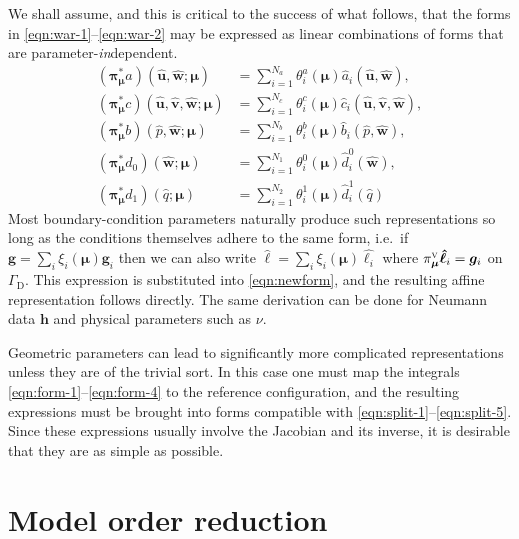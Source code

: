 \documentclass[onecolumn, twoside, a4paper, 11pt]{article}
\begin{document}
We shall assume, and this is critical to the success of what follows, that the
forms in \eqref{eqn:war-1}--\eqref{eqn:war-2} may be expressed as linear
combinations of forms that are parameter-\emph{in}dependent.
\begin{align}
  (\bm\pi_{\bm\mu}^* a)(
    \hat{\bm u},
    \hat{\bm w};
    \bm \mu
  ) &= \sum_{i=1}^{N_a} \theta^a_i(\bm \mu) \hat{a}_i(\hat{\bm u}, \hat{\bm w}), \label{eqn:split-1} \\
  (\bm\pi_{\bm\mu}^* c)(
    \hat{\bm u},
    \hat{\bm v},
    \hat{\bm w};
    \bm \mu
  ) &= \sum_{i=1}^{N_c} \theta^c_i(\bm \mu)
      \hat{c}_i(\hat{\bm u}, \hat{\bm v}, \hat{\bm w}), \label{eqn:split-2} \\
  (\bm\pi_{\bm\mu}^* b)(
    \hat{p},
     \hat{\bm w};
    \bm \mu
  ) &= \sum_{i=1}^{N_b} \theta^b_i(\bm \mu) \hat{b}_i(\hat{p}, \hat{\bm w}), \label{eqn:split-3} \\
  (\bm\pi_{\bm\mu}^* d_0)(
    \hat{\bm w};
    \bm \mu
  ) &= \sum_{i=1}^{N_1} \theta^0_i(\bm \mu) \hat{d}^0_i(\hat{\bm w}), \label{eqn:split-4} \\
  (\bm\pi_{\bm\mu}^* d_1)(
    \hat{q};
    \bm \mu
  ) &= \sum_{i=1}^{N_2} \theta^1_i(\bm \mu) \hat{d}^1_i(\hat{q}) \label{eqn:split-5}
\end{align}
%
Most boundary-condition parameters naturally produce such representations so
long as the conditions themselves adhere to the same form, i.e.~if
$\bm g = \sum_i \xi_i(\bm \mu) \bm g_i$ then we can also write
$\hat{\bm \ell} = \sum_i \xi_i(\bm \mu) \hat{\bm \ell_i}$ where
$\pi_{\bm\mu}^\textsc{v} \bm \hat{\bm{\ell}}_i = \bm{g}_i$ on
$\Gamma_\text{D}$. This expression is substituted into
\eqref{eqn:newform}, and the resulting affine
representation follows directly. The same derivation can be done for Neumann
data $\bm h$ and physical parameters such as $\nu$.

Geometric parameters can lead to significantly more complicated representations
unless they are of the trivial sort. In this case one must map the integrals
\eqref{eqn:form-1}--\eqref{eqn:form-4} to the reference configuration, and the
resulting expressions must be brought into forms compatible with
\eqref{eqn:split-1}--\eqref{eqn:split-5}. Since these expressions usually
involve the Jacobian and its inverse, it is desirable that they are as simple as
possible.

\section{Model order reduction}
\label{sec:reduction}
\end{document}
